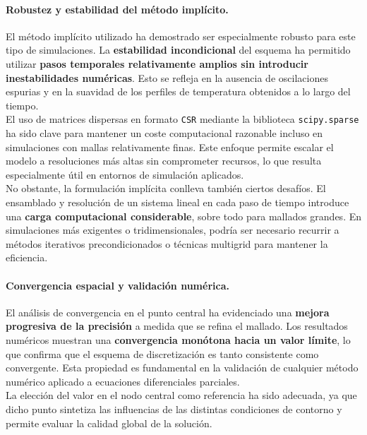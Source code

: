 \documentclass{article}
\begin{document}
\paragraph{Robustez y estabilidad del método implícito.} El método implícito utilizado ha demostrado ser especialmente robusto para este tipo de simulaciones. La \textbf{estabilidad incondicional} del esquema ha permitido utilizar \textbf{pasos temporales relativamente amplios sin introducir inestabilidades numéricas}. Esto se refleja en la ausencia de oscilaciones espurias y en la suavidad de los perfiles de temperatura obtenidos a lo largo del tiempo.\\

El uso de matrices dispersas en formato \texttt{CSR} mediante la biblioteca \texttt{scipy.sparse} ha sido clave para mantener un coste computacional razonable incluso en simulaciones con mallas relativamente finas. Este enfoque permite escalar el modelo a resoluciones más altas sin comprometer recursos, lo que resulta especialmente útil en entornos de simulación aplicados.\\

No obstante, la formulación implícita conlleva también ciertos desafíos. El ensamblado y resolución de un sistema lineal en cada paso de tiempo introduce una \textbf{carga computacional considerable}, sobre todo para mallados grandes. En simulaciones más exigentes o tridimensionales, podría ser necesario recurrir a métodos iterativos precondicionados o técnicas multigrid para mantener la eficiencia.

\paragraph{Convergencia espacial y validación numérica.} El análisis de convergencia en el punto central ha evidenciado una \textbf{mejora progresiva de la precisión} a medida que se refina el mallado. Los resultados numéricos muestran una \textbf{convergencia monótona hacia un valor límite}, lo que confirma que el esquema de discretización es tanto consistente como convergente. Esta propiedad es fundamental en la validación de cualquier método numérico aplicado a ecuaciones diferenciales parciales.\\

La elección del valor en el nodo central como referencia ha sido adecuada, ya que dicho punto sintetiza las influencias de las distintas condiciones de contorno y permite evaluar la calidad global de la solución.\\
\end{document}
